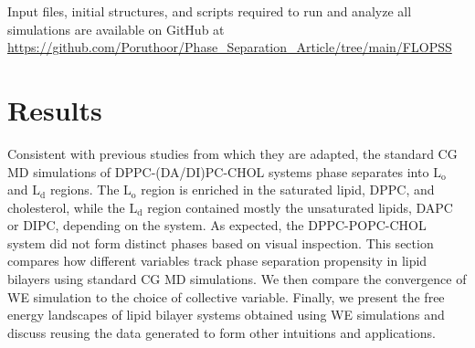 \documentclass{biophys-new}
\begin{document}
Input files, initial structures, and scripts required to run and analyze all simulations are available on GitHub at \href{https://github.com/Poruthoor/Phase\_Separation\_Article/tree/main/FLOPSS}{https://github.com/Poruthoor/Phase\_Separation\_Article/tree/main/FLOPSS}

\section*{Results}

Consistent with previous studies from which they are adapted, the standard CG MD simulations of DPPC-(DA/DI)PC-CHOL systems phase separates into $\text{L}_{\text{o}}$ and $\text{L}_{\text{d}}$ regions.
The $\text{L}_{\text{o}}$ region is enriched in the saturated lipid, DPPC, and cholesterol, while the
$\text{L}_{\text{d}}$ region contained mostly the unsaturated lipids, DAPC or DIPC, depending on the system.
As expected, the DPPC-POPC-CHOL system did not form distinct phases based on visual inspection.
This section compares how different variables track phase separation propensity in lipid bilayers using standard CG MD simulations.
We then compare the convergence of WE simulation to the choice of collective variable.
Finally, we present the free energy landscapes of lipid bilayer systems obtained using WE simulations and discuss reusing the data generated to form other intuitions and applications.

\end{document}
